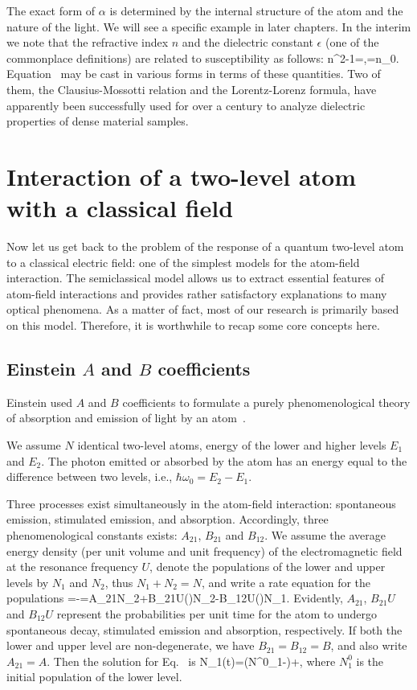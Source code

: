 The exact form of $\alpha$ is determined by the internal structure of the atom and the nature of the light. We will see a specific example in later chapters. In the interim we note that the refractive index $n$ and the dielectric constant $\epsilon$ (one of the commonplace definitions) are related to susceptibility as follows:
\beq
n^2-1=\chi,\quad \epsilon=n\epsilon_0.
\eeq
Equation~ may be cast in various forms in terms of these quantities. Two of them, the Clausius-Mossotti relation and the Lorentz-Lorenz formula, have apparently been successfully used for over a century to analyze dielectric properties of dense material samples.

\section{Interaction of a two-level atom with a classical field}

Now let us get back to the problem of the response of a quantum two-level atom to a classical electric field: one of the simplest models for the atom-field interaction\cite{quantum_optics}. The semiclassical model allows us to extract essential features of atom-field interactions and provides rather satisfactory explanations to many optical phenomena. As a matter of fact, most of our research is primarily based on this model. Therefore, it is worthwhile to recap some core concepts here.

\subsection{Einstein $A$ and $B$ coefficients}
Einstein used $A$ and $B$ coefficients to formulate a purely phenomenological theory of  absorption and emission of light by an atom~\cite{quantum_optics,1982AmJPh..50..982H}.

We assume $N$ identical two-level atoms, energy of the lower and higher levels  $E_1$ and $E_2$. The photon emitted or absorbed by the atom has an energy equal to the difference between two levels, i.e., $\hbar\omega_0=E_2-E_1$.

Three processes exist simultaneously in the atom-field interaction: spontaneous emission, stimulated emission, and absorption. Accordingly, three phenomenological constants exists: $A_{21}$, $B_{21}$ and $B_{12}$. We assume the average energy density (per unit volume and unit frequency) of the electromagnetic field at the resonance frequency $U$, denote the populations of the lower and upper levels by $N_1$ and $N_2$, thus $N_1+N_2=N$, and write a rate equation for the populations
\bea
{}=-=A_{21}N_2+B_{21}U(\omega)N_2-B_{12}U(\omega)N_1.
\label{AB_RATE}
\eea
Evidently, $A_{21}$, $B_{21}U$ and $B_{12}U$ represent the probabilities per unit time for the atom to undergo spontaneous decay, stimulated emission and absorption, respectively. 
If  both the lower and upper level are non-degenerate, we  have $B_{21}=B_{12}=B$, and also write $A_{21}=A$. Then the solution for Eq.~ is
\bea
N_1(t)=\left(N^0_1-\right)\exp{}+,
\eea
where $N^0_1$ is the initial population of the lower level.

